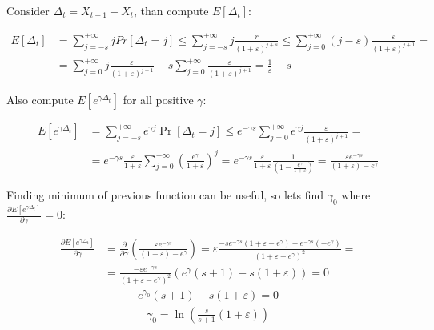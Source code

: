 \documentclass[12pt, a4paper]{article}
\theoremstyle{remark}
\theoremstyle{definition}
\begin{document}
Consider \(\Delta_t = X_{t + 1} - X_{t}\), than compute \(E[\Delta_t]\):

\begin{align*}
    E[\Delta_t] &= \sum_{j = -s}^{+\infty} j Pr[\Delta_t = j] \leq \sum_{j = -s}^{+\infty} j \frac{r}{(1 + \varepsilon)^{j + s}} \leq \sum_{j = 0}^{+\infty} (j - s) \frac{\varepsilon}{(1 + \varepsilon)^{j + 1}} = \\
    &= \sum_{j = 0}^{+\infty} j \frac{\varepsilon}{(1 + \varepsilon)^{j + 1}} - s \sum_{j = 0}^{+\infty}\frac{\varepsilon}{(1 + \varepsilon)^{j + 1}} = \frac{1}{\varepsilon} - s
\end{align*}

Also compute \(E\left[e^{\gamma \Delta_t}\right]\) for all positive \(\gamma\):

\begin{align*}
    E[e^{\gamma \Delta_t}] &= \sum_{j = -s}^{+\infty} e^{\gamma j} \Pr[\Delta_t = j] \leq e^{-\gamma s} \sum_{j = 0}^{+\infty} e^{\gamma j} \frac{\varepsilon}{(1 + \varepsilon)^{j + 1}} = \\
    &= e^{-\gamma s} \frac{\varepsilon}{1 + \varepsilon} \sum_{j = 0}^{+\infty} \left(\frac{e^\gamma}{1 + \varepsilon}\right)^j = e^{-\gamma s} \frac{\varepsilon}{1 + \varepsilon} \frac{1}{(1 - \frac{e^\gamma}{1 + \varepsilon})} = \frac{\varepsilon e^{-\gamma s}}{(1 + \varepsilon) - e^\gamma} 
\end{align*}

Finding minimum of previous function can be useful, so lets find \(\gamma_0\) where \(\frac{\partial E[e^{\gamma \Delta_t}]}{\partial \gamma} = 0\):

\begin{align*}
    \frac{\partial E[e^{\gamma \Delta_t}]}{\partial \gamma} &= \frac{\partial }{\partial \gamma} \left(\frac{\varepsilon e^{-\gamma s}}{(1 + \varepsilon) - e^\gamma}\right) = \varepsilon \frac{-s e^{-\gamma s} (1 + \varepsilon - e^\gamma) - e^{-\gamma s}(-e^\gamma)}{(1 + \varepsilon - e^\gamma)^2} = \\
    &= \frac{-\varepsilon e^{-\gamma s}}{(1 + \varepsilon - e^\gamma)^2} (e^\gamma (s + 1) - s (1 + \varepsilon)) = 0
\end{align*}
\begin{align*}
    e^{\gamma_0} (s + 1) - s (1 + \varepsilon) = 0
\end{align*}
\begin{align*}
    \gamma_0 = \ln\left(\frac{s}{s + 1}(1 + \varepsilon)\right)
\end{align*}
\end{document}
